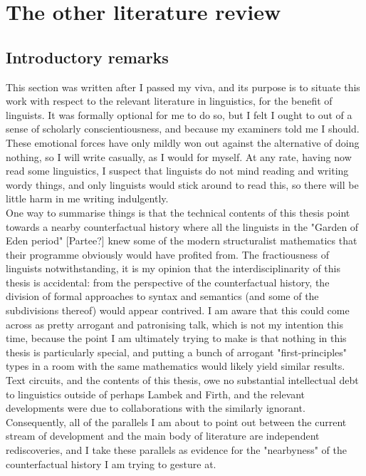 
\section{The other literature review}

\subsection{Introductory remarks}

This section was written after I passed my viva, and its purpose is to situate this work with respect to the relevant literature in linguistics, for the benefit of linguists. It was formally optional for me to do so, but I felt I ought to out of a sense of scholarly conscientiousness, and because my examiners told me I should. These emotional forces have only mildly won out against the alternative of doing nothing, so I will write casually, as I would for myself. At any rate, having now read some linguistics, I suspect that linguists do not mind reading and writing wordy things, and only linguists would stick around to read this, so there will be little harm in me writing indulgently.\\

One way to summarise things is that the technical contents of this thesis point towards a nearby counterfactual history where all the linguists in the "Garden of Eden period" [Partee?] knew some of the modern structuralist mathematics that their programme obviously would have profited from. The fractiousness of linguists notwithstanding, it is my opinion that the interdisciplinarity of this thesis is accidental: from the perspective of the counterfactual history, the division of formal approaches to syntax and semantics (and some of the subdivisions thereof) would appear contrived. I am aware that this could come across as pretty arrogant and patronising talk, which is not my intention this time, because the point I am ultimately trying to make is that nothing in this thesis is particularly special, and putting a bunch of arrogant "first-principles" types in a room with the same mathematics would likely yield similar results. Text circuits, and the contents of this thesis, owe no substantial intellectual debt to linguistics outside of perhaps Lambek and Firth, and the relevant developments were due to collaborations with the similarly ignorant. Consequently, all of the parallels I am about to point out between the current stream of development and the main body of literature are independent rediscoveries, and I take these parallels as evidence for the "nearbyness" of the counterfactual history I am trying to gesture at.

